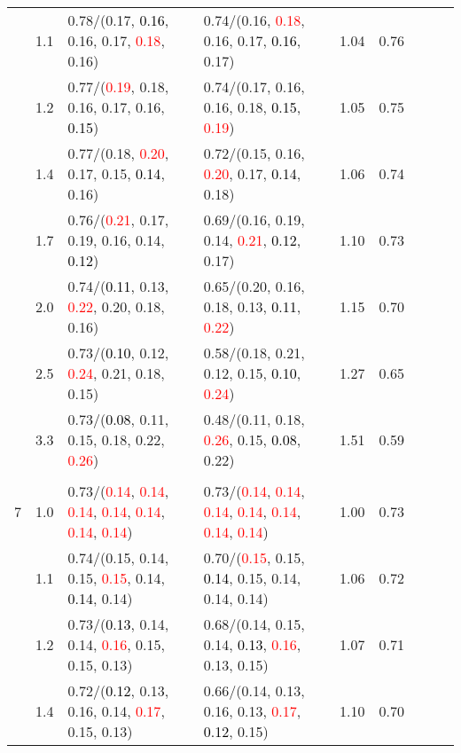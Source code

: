 \documentclass[10pt,a4paper]{report}
\begin{document}
\begin{table}[!htbp]
\begin{center}
{\begin{tabular}{ccllccccc}
			&1.1&0.78/(0.17, \textcolor{black}{0.16}, 0.16, 0.17, \textcolor{red}{0.18}, 0.16)&0.74/(0.16, \textcolor{red}{0.18}, 0.16, 0.17, \textcolor{black}{0.16}, 0.17)&1.04&0.76\\
			&1.2&0.77/(\textcolor{red}{0.19}, 0.18, 0.16, 0.17, 0.16, \textcolor{black}{0.15})&0.74/(0.17, 0.16, 0.16, 0.18, \textcolor{black}{0.15}, \textcolor{red}{0.19})&1.05&0.75\\
			&1.4&0.77/(0.18, \textcolor{red}{0.20}, 0.17, 0.15, \textcolor{black}{0.14}, 0.16)&0.72/(0.15, 0.16, \textcolor{red}{0.20}, 0.17, \textcolor{black}{0.14}, 0.18)&1.06&0.74\\
			&1.7&0.76/(\textcolor{red}{0.21}, 0.17, 0.19, 0.16, 0.14, \textcolor{black}{0.12})&0.69/(0.16, 0.19, 0.14, \textcolor{red}{0.21}, \textcolor{black}{0.12}, 0.17)&1.10&0.73\\
			&2.0&0.74/(\textcolor{black}{0.11}, 0.13, \textcolor{red}{0.22}, 0.20, 0.18, 0.16)&0.65/(0.20, 0.16, 0.18, 0.13, \textcolor{black}{0.11}, \textcolor{red}{0.22})&1.15&0.70\\
			&2.5&0.73/(\textcolor{black}{0.10}, 0.12, \textcolor{red}{0.24}, 0.21, 0.18, 0.15)&0.58/(0.18, 0.21, 0.12, 0.15, \textcolor{black}{0.10}, \textcolor{red}{0.24})&1.27&0.65\\
			&3.3&0.73/(\textcolor{black}{0.08}, 0.11, 0.15, 0.18, 0.22, \textcolor{red}{0.26})&0.48/(0.11, 0.18, \textcolor{red}{0.26}, 0.15, \textcolor{black}{0.08}, 0.22)&1.51&0.59\\
			&&&&\\
			7			&1.0&0.73/(\textcolor{red}{0.14}, \textcolor{red}{0.14}, \textcolor{red}{0.14}, \textcolor{red}{0.14}, \textcolor{red}{0.14}, \textcolor{red}{0.14}, \textcolor{red}{0.14})&0.73/(\textcolor{red}{0.14}, \textcolor{red}{0.14}, \textcolor{red}{0.14}, \textcolor{red}{0.14}, \textcolor{red}{0.14}, \textcolor{red}{0.14}, \textcolor{red}{0.14})&1.00&0.73\\
			&1.1&0.74/(0.15, 0.14, 0.15, \textcolor{red}{0.15}, 0.14, \textcolor{black}{0.14}, 0.14)&0.70/(\textcolor{red}{0.15}, 0.15, \textcolor{black}{0.14}, 0.15, 0.14, 0.14, 0.14)&1.06&0.72\\
			&1.2&0.73/(\textcolor{black}{0.13}, 0.14, 0.14, \textcolor{red}{0.16}, 0.15, 0.15, 0.13)&0.68/(0.14, 0.15, 0.14, \textcolor{black}{0.13}, \textcolor{red}{0.16}, 0.13, 0.15)&1.07&0.71\\
			&1.4&0.72/(\textcolor{black}{0.12}, 0.13, 0.16, 0.14, \textcolor{red}{0.17}, 0.15, 0.13)&0.66/(0.14, 0.13, 0.16, 0.13, \textcolor{red}{0.17}, \textcolor{black}{0.12}, 0.15)&1.10&0.70\\

\end{tabular}}
\end{center}
\end{table}
\end{document}
